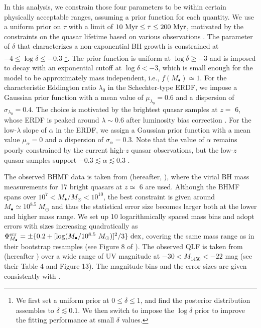 \documentclass[twocolumn, twocolappendix]{aastex63}
\newcommand{\Msun}{M_\odot}
\newcommand{\Mbh}{M_\bullet}
\newcommand{\tlife}{\tau}
\newcommand{\Muv}{M_{1450}}
\begin{document}
\begin{CJK*}{UTF8}{gbsn}
In this analysis, we constrain those four parameters to be within certain physically acceptable ranges, 
assuming a prior function for each quantity.
We use a uniform prior on $\tlife$ with a limit of $10~{\rm Myr} \leq \tlife \leq 200~{\rm Myr}$,
motivated by the constraints on the quasar lifetime based on various observations
\citep[e.g.,][]{2004cbhg.symp..169M}.
The parameter of $\delta$ that characterizes a non-exponential BH growth 
is constrained at $-4 \leq \log \delta \leq -0.3$
\footnote[4]{ We first set a uniform prior at $0\leq \delta \leq 1$, 
and find the posterior distribution assembles to $\delta \lesssim 0.1$.
We then switch to impose the $\log \delta$ prior to improve the fitting performance at small $\delta$ values.}.
The prior function is uniform at $\log \delta \geq -3$ and is imposed to decay with an exponential cutoff at $\log \delta < -3$,
which is small enough for the model to be approximately mass independent, i.e., $f(M_\bullet)\simeq1$.
For the characteristic Eddington ratio $\lambda_0$ in the Schechter-type ERDF, 
we impose a Gaussian prior function with a mean value of $\mu_{\lambda_0}=0.6$ and a dispersion of $\sigma_{\lambda_0}=0.4$.
The choice is motivated by the brightest quasar samples at $z=$ 6, whose ERDF is peaked around $\lambda \sim 0.6$ 
after luminosity bias correction \citep[e.g.,][]{2010AJ....140..546W}.
For the low-$\lambda$ slope of $\alpha$ in the ERDF, we assign a Gaussian prior function with a mean value 
$\mu_{\alpha}=0$ and a dispersion of $\sigma_{\alpha}=0.3$.
Note that the value of $\alpha$ remains poorly constrained by the current high-$z$ quasar observations,
but the low-$z$ quasar samples support $-0.3 \lesssim \alpha \lesssim 0.3$ \citep[e.g., see Figure 21 in][]{2015MNRAS.447.2085S}.


The observed BHMF data is taken from \citet{2010AJ....140..546W} (hereafter, ), where 
the virial BH mass measurements for 17 bright quasars at $z\simeq $ 6 are used.
Although the BHMF spans over $10^7 < \Mbh/\Msun <10^{10}$, the best constraint is given around 
$\Mbh \simeq 10^{8.5}~\Msun$
and thus the statistical error size becomes larger both at the lower and higher mass range.
We set up 10 logarithmically spaced mass bins and adopt errors with sizes increasing quadratically as 
$\Phi_{\Mbh}^{\rm err} = \pm \{0.2 +   [\log (\Mbh/10^{8.5}~\Msun)]^2/3 \}~{\rm dex}$,
covering the same mass range as in their bootstrap resamples (see Figure 8 of ). 
The observed QLF is taken from \citet{2018ApJ...869..150M} (hereafter ) 
over a wide range of UV magnitude at $-30 < \Muv <-22$ mag (see their Table 4 and Figure 13). 
The magnitude bins and the error sizes are given consistently with .


\end{CJK*}
\end{document}
